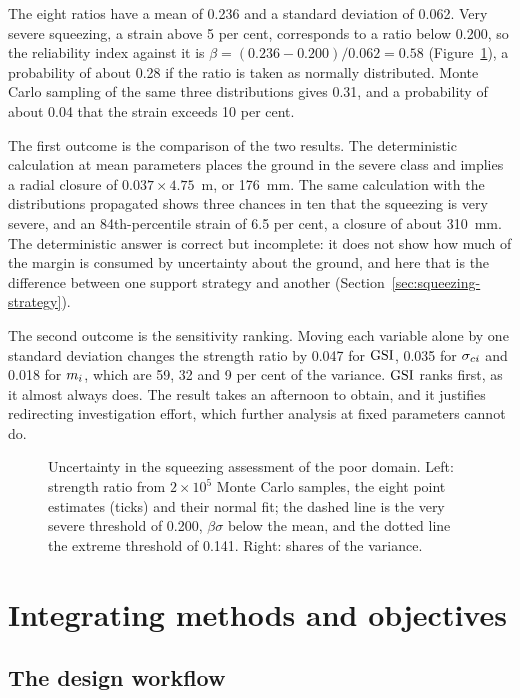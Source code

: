 The eight ratios have a mean of 0.236 and a standard deviation of 0.062.
Very severe squeezing, a strain above 5 per cent, corresponds to a ratio
below 0.200, so the reliability index against it is
$\beta = (0.236 - 0.200)/0.062 = 0.58$
(Figure~\ref{fig:squeezing-uncertainty}), a probability of about 0.28 if the
ratio is taken as normally distributed. Monte Carlo sampling of the same
three distributions gives 0.31, and a probability of about 0.04 that the
strain exceeds 10 per cent.

The first outcome is the comparison of the two results. The deterministic calculation at
mean parameters places the ground in the severe class and implies a radial
closure of $0.037 \times 4.75$~m, or 176~mm. The same calculation with the
distributions propagated shows three chances in ten that the squeezing is
very severe, and an 84th-percentile strain of 6.5 per cent, a closure of
about 310~mm. The deterministic answer is correct but incomplete:
it does not show how much of the margin is consumed by uncertainty
about the ground, and here that is the difference between one support
strategy and another (Section~\ref{sec:squeezing-strategy}).

The second outcome is the sensitivity ranking. Moving each variable alone by
one standard deviation changes the strength ratio by 0.047 for $\mathrm{GSI}$, 0.035
for $\sigma_{ci}$ and 0.018 for $m_i$, which are 59, 32 and 9 per cent of the
variance. $\mathrm{GSI}$ ranks first, as it almost always does. The result takes
an afternoon to obtain, and it justifies redirecting investigation effort,
which further analysis at fixed parameters cannot do.

\begin{figure}[htbp]
\centering
{}
\caption{Uncertainty in the squeezing assessment of the poor domain. Left: strength ratio from $2\times10^5$ Monte Carlo samples, the eight point estimates (ticks) and their normal fit; the dashed line is the very severe threshold of 0.200, $\beta\sigma$ below the mean, and the dotted line the extreme threshold of 0.141. Right: shares of the variance.}
\label{fig:squeezing-uncertainty}
\end{figure}

\section{Integrating methods and objectives}
\label{sec:integrating-methods-and-objectives}

\subsection{The design workflow}
\label{sec:design-workflow}

